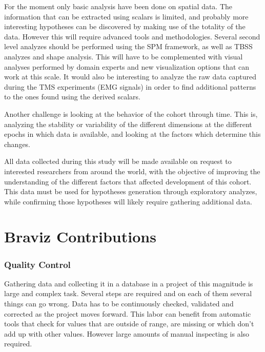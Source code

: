 For the moment only basic analysis have been done on spatial data. The information that can be extracted using scalars is limited, and probably more interesting hypotheses can be discovered by making use of the totality of the data. However this will require advanced tools and methodologies. Several second level analyzes should be performed using the SPM framework, as well as TBSS analyzes and shape analysis. This will have to be complemented with visual analyses performed by domain experts and new visualization options that can work at this scale. It would also be interesting to analyze the raw data captured during the TMS experiments (EMG signals) in order to find additional patterns to the ones found using the derived scalars. 

Another challenge is looking at the behavior of the cohort through time. This is, analyzing the stability or variability of the different dimensions at the different epochs in which data is available, and looking at the factors which determine this changes.

All data collected during this study will be made available on request to interested researchers from around the world, with the objective of improving the understanding of the different factors that affected development of this cohort. This data must be used for hypotheses generation through exploratory analyzes, while confirming those hypotheses will likely require gathering additional data.



\section{Braviz Contributions}

\subsubsection{Quality Control}

Gathering data and collecting it in a database in a project of this magnitude is large and complex task. Several steps are required and on each of them several things can go wrong. Data has to be continuously checked, validated and corrected as the project moves forward. This labor can benefit from automatic tools that check for values that are outside of range, are missing or which don't add up with other values. However large amounts of manual inspecting is also required. 

